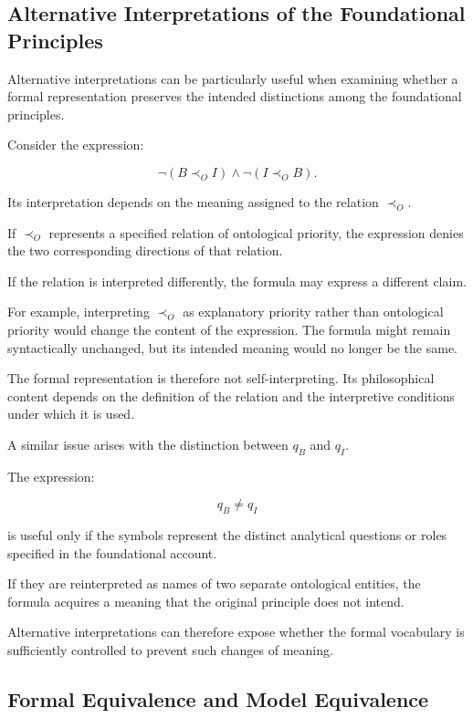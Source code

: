 \subsection{Alternative Interpretations of the Foundational
Principles}

Alternative interpretations can be particularly useful
when examining whether a formal representation preserves
the intended distinctions among the foundational
principles.

Consider the expression:

\[
    \neg(B \prec_O I)
    \land
    \neg(I \prec_O B).
\]

Its interpretation depends on the meaning assigned
to the relation \(\prec_O\).

If \(\prec_O\) represents a specified relation of
ontological priority, the expression denies the
two corresponding directions of that relation.

If the relation is interpreted differently, the
formula may express a different claim.

For example, interpreting \(\prec_O\) as explanatory
priority rather than ontological priority would change
the content of the expression. The formula might
remain syntactically unchanged, but its intended
meaning would no longer be the same.

The formal representation is therefore not self-interpreting.
Its philosophical content depends on the definition
of the relation and the interpretive conditions
under which it is used.

A similar issue arises with the distinction between
\(q_B\) and \(q_I\).

The expression:

\[
    q_B \neq q_I
\]

is useful only if the symbols represent the distinct
analytical questions or roles specified in the
foundational account.

If they are reinterpreted as names of two separate
ontological entities, the formula acquires a meaning
that the original principle does not intend.

Alternative interpretations can therefore expose
whether the formal vocabulary is sufficiently
controlled to prevent such changes of meaning.

\subsection{Formal Equivalence and Model Equivalence}


